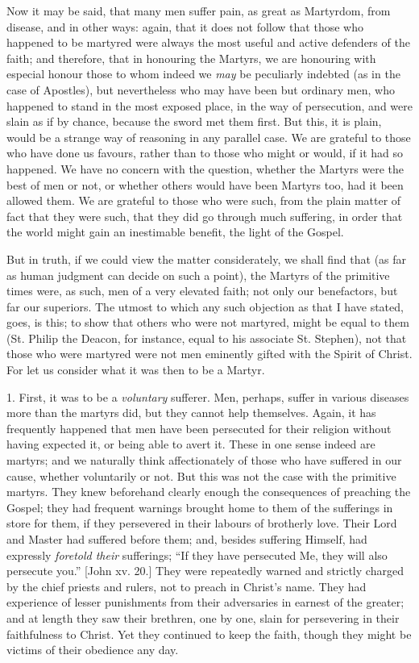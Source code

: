 Now it may be said, that many men suffer pain, as great as
Martyrdom, from disease, and in other ways: again, that it does not
follow that those who happened to be martyred were always the most
useful and active defenders of the faith; and therefore, that in
honouring the Martyrs, we are honouring with especial honour those to
whom indeed we \emph{may} be peculiarly indebted (as in the case of
Apostles), but nevertheless who may have been but ordinary men, who
happened to stand in the most exposed place, in the way of
persecution, and were slain as if by chance, because the sword met
them first. But this, it is plain, would be a strange way of reasoning
in any parallel case. We are grateful to those who have done us
favours, rather than to those who might or would, if it had so
happened. We have no concern with the question, whether the Martyrs
were the best of men or not, or whether others would have been Martyrs
too, had it been allowed them. We are grateful to those who were such,
from the plain matter of fact that they were such, that they did go
through much suffering, in order that the world might gain an
inestimable benefit, the light of the Gospel.

But in truth, if we could view the matter considerately, we shall
find that (as far as human judgment can decide on such a point), the
Martyrs of the primitive times were, as such, men of a very elevated
faith; not only our benefactors, but far our superiors. The utmost to
which any such objection as that I have stated, goes, is this; to show
that others who were not martyred, might be equal to them (St. Philip
the Deacon, for instance, equal to his associate St. Stephen), not
that those who were martyred were not men eminently gifted with the
Spirit of Christ. For let us consider what it was then to be a Martyr.

1. First, it was to be a \emph{voluntary} sufferer. Men, perhaps,
suffer in various diseases more than the martyrs did, but they cannot
help themselves. Again, it has frequently happened that men have been
persecuted for their religion without having expected it, or being
able to avert it. These in one sense indeed are martyrs; and we
naturally think affectionately of those who have suffered in our
cause, whether voluntarily or not. But this was not the case with the
primitive martyrs. They knew beforehand clearly enough the
consequences of preaching the Gospel; they had frequent warnings
brought home to them of the sufferings in store for them, if they
persevered in their labours of brotherly love. Their Lord and Master
had suffered before them; and, besides suffering Himself, had
expressly \emph{foretold their} sufferings; ``If they have
persecuted Me, they will also persecute you.'' [John xv. 20.] They
were repeatedly warned and strictly charged by the chief priests and
rulers, not to preach in Christ's name. They had experience of lesser
punishments from their adversaries in earnest of the greater; and at
length they saw their brethren, one by one, slain for persevering in
their faithfulness to Christ. Yet they continued to keep the faith,
though they might be victims of their obedience any day.

